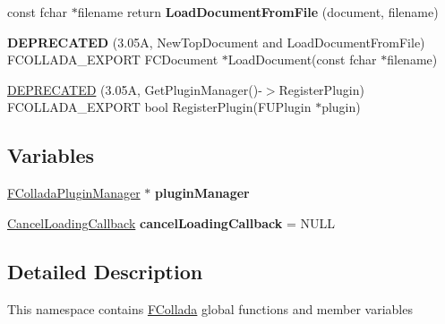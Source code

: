 \begin{DoxyCompactItemize}
\item 
\hypertarget{namespaceFCollada_afc41f0c09caca13f7131ac93dfbf21aa}{
const fchar $\ast$filename return {\bfseries LoadDocumentFromFile} (document, filename)}
\label{namespaceFCollada_afc41f0c09caca13f7131ac93dfbf21aa}

\item 
\hypertarget{namespaceFCollada_ab3a564d246ffa3bc28e00d3b4406c81b}{
{\bfseries DEPRECATED} (3.05A, NewTopDocument and LoadDocumentFromFile) FCOLLADA\_\-EXPORT FCDocument $\ast$LoadDocument(const fchar $\ast$filename)}
\label{namespaceFCollada_ab3a564d246ffa3bc28e00d3b4406c81b}

\item 
\hyperlink{namespaceFCollada_a6d047a68a1957e70ff47a695bffa1ebd}{DEPRECATED} (3.05A, GetPluginManager()-\/$>$RegisterPlugin) FCOLLADA\_\-EXPORT bool RegisterPlugin(FUPlugin $\ast$plugin)
\end{DoxyCompactItemize}
\subsection*{Variables}
\begin{DoxyCompactItemize}
\item 
\hypertarget{namespaceFCollada_a2154b72a57c15b012b0430dd9b9d9445}{
\hyperlink{classFColladaPluginManager}{FColladaPluginManager} $\ast$ {\bfseries pluginManager}}
\label{namespaceFCollada_a2154b72a57c15b012b0430dd9b9d9445}

\item 
\hypertarget{namespaceFCollada_a3da1ee595f827bba2e7fc651a8dfb241}{
\hyperlink{classIFunctor0}{CancelLoadingCallback} {\bfseries cancelLoadingCallback} = NULL}
\label{namespaceFCollada_a3da1ee595f827bba2e7fc651a8dfb241}

\end{DoxyCompactItemize}


\subsection{Detailed Description}
This namespace contains \hyperlink{namespaceFCollada}{FCollada} global functions and member variables 

